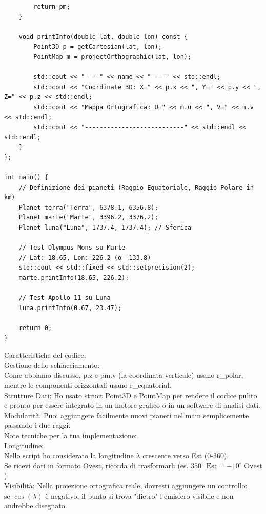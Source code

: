 \documentclass[a4paper,14pt]{article}
\begin{document}
{\begin{verbatim}
        return pm;
    }

    void printInfo(double lat, double lon) const {
        Point3D p = getCartesian(lat, lon);
        PointMap m = projectOrthographic(lat, lon);

        std::cout << "--- " << name << " ---" << std::endl;
        std::cout << "Coordinate 3D: X=" << p.x << ", Y=" << p.y << ", Z=" << p.z << std::endl;
        std::cout << "Mappa Ortografica: U=" << m.u << ", V=" << m.v << std::endl;
        std::cout << "---------------------------" << std::endl << std::endl;
    }
};

int main() {
    // Definizione dei pianeti (Raggio Equatoriale, Raggio Polare in km)
    Planet terra("Terra", 6378.1, 6356.8);
    Planet marte("Marte", 3396.2, 3376.2);
    Planet luna("Luna", 1737.4, 1737.4); // Sferica

    // Test Olympus Mons su Marte
    // Lat: 18.65, Lon: 226.2 (o -133.8)
    std::cout << std::fixed << std::setprecision(2);
    marte.printInfo(18.65, 226.2);

    // Test Apollo 11 su Luna
    luna.printInfo(0.67, 23.47);

    return 0;
}
\end{verbatim}
}
Caratteristiche del codice:\\
Gestione dello schiacciamento:\\
Come abbiamo discusso, p.z e pm.v (la coordinata verticale) usano r\_polar, mentre le componenti orizzontali usano r\_equatorial.\\
Strutture Dati: Ho usato struct Point3D e PointMap per rendere il codice pulito e pronto per essere integrato in un motore grafico o in un software di analisi dati.\\
Modularità: Puoi aggiungere facilmente nuovi pianeti nel main semplicemente passando i due raggi.\\
Note tecniche per la tua implementazione:\\
Longitudine:\\
Nello script ho considerato la longitudine \(\lambda \) crescente verso Est (0-360).\\
Se ricevi dati in formato Ovest, ricorda di trasformarli (es. \(350^{\circ }\text{\ Est}=-10^{\circ }\text{\ Ovest}\)).\\
Visibilità: Nella proiezione ortografica reale, dovresti aggiungere un controllo:\\
se \(\cos (\lambda )\) è negativo, il punto si trova "dietro" l'emisfero visibile e non andrebbe disegnato.
\end{document}
